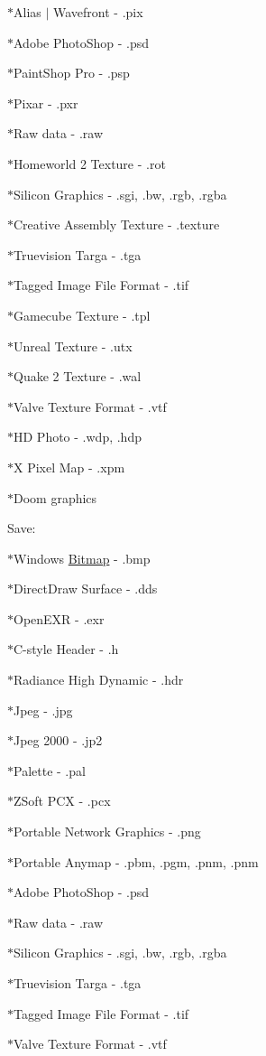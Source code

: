  $\ast$Alias $|$ Wavefront -\/ .pix \par
 $\ast$Adobe PhotoShop -\/ .psd \par
 $\ast$PaintShop Pro -\/ .psp \par
 $\ast$Pixar -\/ .pxr \par
 $\ast$Raw data -\/ .raw \par
 $\ast$Homeworld 2 Texture -\/ .rot \par
 $\ast$Silicon Graphics -\/ .sgi, .bw, .rgb, .rgba \par
 $\ast$Creative Assembly Texture -\/ .texture \par
 $\ast$Truevision Targa -\/ .tga \par
 $\ast$Tagged Image File Format -\/ .tif \par
 $\ast$Gamecube Texture -\/ .tpl \par
 $\ast$Unreal Texture -\/ .utx \par
 $\ast$Quake 2 Texture -\/ .wal \par
 $\ast$Valve Texture Format -\/ .vtf \par
 $\ast$HD Photo -\/ .wdp, .hdp \par
 $\ast$X Pixel Map -\/ .xpm \par
 $\ast$Doom graphics \par
 \par
 Save: \par
 $\ast$Windows \hyperlink{class_f2_c_1_1_bitmap}{Bitmap} -\/ .bmp \par
 $\ast$DirectDraw Surface -\/ .dds \par
 $\ast$OpenEXR -\/ .exr \par
 $\ast$C-\/style Header -\/ .h \par
 $\ast$Radiance High Dynamic -\/ .hdr \par
 $\ast$Jpeg -\/ .jpg \par
 $\ast$Jpeg 2000 -\/ .jp2 \par
 $\ast$Palette -\/ .pal \par
 $\ast$ZSoft PCX -\/ .pcx \par
 $\ast$Portable Network Graphics -\/ .png \par
 $\ast$Portable Anymap -\/ .pbm, .pgm, .pnm, .pnm \par
 $\ast$Adobe PhotoShop -\/ .psd \par
 $\ast$Raw data -\/ .raw \par
 $\ast$Silicon Graphics -\/ .sgi, .bw, .rgb, .rgba \par
 $\ast$Truevision Targa -\/ .tga \par
 $\ast$Tagged Image File Format -\/ .tif \par
 $\ast$Valve Texture Format -\/ .vtf \par
 

